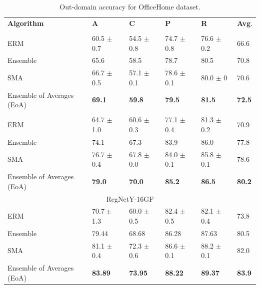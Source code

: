 \begin{table}[]
\centering
\caption{Out-domain accuracy for OfficeHome dataset.}
\begin{tabular}{lllll|l}
\hline
\textbf{Algorithm}          & \textbf{A}           & \textbf{C}           & \textbf{P}     & \textbf{R}    & \textbf{Avg}. \\ \hhline{=====|=}
\multicolumn{6}{c}{{ResNet-50}}\\
\hline
ERM & 60.5 $\pm$ 0.7           & 54.5 $\pm$ 0.8           & 74.7 $\pm$ 0.8          & 76.6 $\pm$ 0.2         & 66.6\\
Ensemble & 65.6             & 58.5           &       78.7         & 80.5 &   70.8  \\
\hline
\rowcolor{Gray}
SMA & 66.7 $\pm$ 0.5           & 57.1 $\pm$ 0.1           & 78.6 $\pm$ 0.1          & 80.0 $\pm$ 0         & 70.6\\
 \rowcolor{Gray}
Ensemble of Averages (EoA) & \textbf{69.1}           & \textbf{59.8}           & \textbf{79.5}           &        \textbf{81.5}        & \textbf{72.5}\\ 
\hhline{=====|=}
\multicolumn{6}{c}{{ResNeXt-50 32x4d  \cite{yalniz2019billion}}}\\
\hline
ERM & 64.7 $\pm$ 1.0 & 60.6 $\pm$ 0.3 & 77.1 $\pm$ 0.4 & 81.3 $\pm$ 0.2 & 70.9 \\ %
Ensemble & 74.1             & 67.3                 & 83.9           &          86.0      &   77.8  \\
\hline
\rowcolor{Gray}
SMA    & 76.7 $\pm$ 0.4 & 67.8 $\pm$ 0.0   & 84.0 $\pm$ 0.1  & 85.8 $\pm$ 0.1 & 78.6 \\ 
 \rowcolor{Gray}
Ensemble of Averages (EoA) & \textbf{79.0}           & \textbf{70.0}      & \textbf{85.2}   &  \textbf{86.5}   & \textbf{80.2} \\
\hline
\multicolumn{6}{c}{{RegNetY-16GF \cite{singh2022revisiting}}}\\
\hline
ERM &  $ 70.7\pm$ 1.3 & 60.0  $\pm$ 0.5 & 82.4 $\pm$ 0.5 & 82.1 $\pm$ 0.4  & 73.8 \\ %
Ensemble &     79.44     &      68.68    & 86.28 &         87.63     &  80.5  \\
\hline
\rowcolor{Gray}
SMA    & 81.1 $\pm$ 0.4 & 72.3 $\pm$ 0.6  & 86.6 $\pm$ 0.1 & 88.2 $\pm$ 0.1 & 82.0 \\ 
 \rowcolor{Gray}
Ensemble of Averages (EoA) & \textbf{83.89}           & \textbf{73.95}      & \textbf{88.22}   &  \textbf{89.37}   & \textbf{83.9} \\
\end{tabular}
\label{tab:office_perf}
\end{table}



